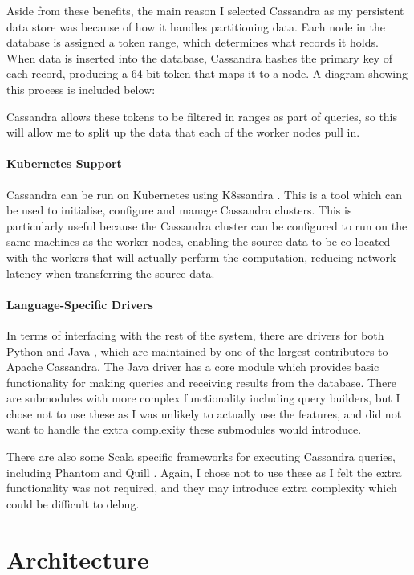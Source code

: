 Aside from these benefits, the main reason I selected Cassandra as my persistent data store was because of how it handles partitioning data. Each node in the database is assigned a token range, which determines what records it holds. When data is inserted into the database, Cassandra hashes the primary key of each record, producing a 64-bit token that maps it to a node. A diagram showing this process is included below:


Cassandra allows these tokens to be filtered in ranges as part of queries, so this will allow me to split up the data that each of the worker nodes pull in.

\paragraph{Kubernetes Support} Cassandra can be run on Kubernetes using K8ssandra \cite{k8ssandra}. This is a tool which can be used to initialise, configure and manage Cassandra clusters. This is particularly useful because the Cassandra cluster can be configured to run on the same machines as the worker nodes, enabling the source data to be co-located with the workers that will actually perform the computation, reducing network latency when transferring the source data.

\paragraph{Language-Specific Drivers}In terms of interfacing with the rest of the system, there are drivers for both Python and Java , which are maintained by one of the largest contributors to Apache Cassandra. The Java driver has a core module which provides basic functionality for making queries and receiving results from the database. There are submodules with more complex functionality including query builders, but I chose not to use these as I was unlikely to actually use the features, and did not want to handle the extra complexity these submodules would introduce.

There are also some Scala specific frameworks for executing Cassandra queries, including Phantom and Quill . Again, I chose not to use these as I felt the extra functionality was not required, and they may introduce extra complexity which could be difficult to debug.


\section{Architecture}

